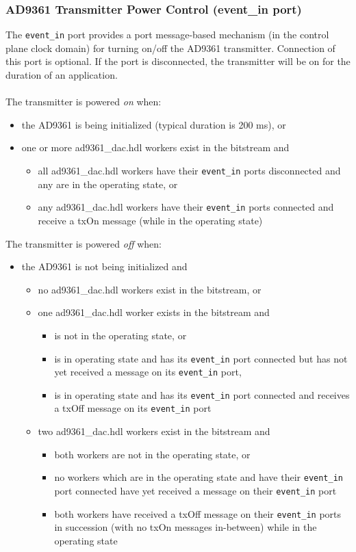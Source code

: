 \documentclass{article}
\def\comp{ad9361\_dac}
\begin{document}
\subsubsection*{AD9361 Transmitter Power Control (event\_in port)}
\noindent The \verb+event_in+ port provides a port message-based mechanism (in the control plane clock domain) for turning on/off the AD9361 transmitter. Connection of this port is optional. If the port is disconnected, the transmitter will be on for the duration of an application. \\ \\
\noindent The transmitter is powered \textit{on} when:
\begin{itemize}
  \item the AD9361 is being initialized (typical duration is 200 ms), or
  \item one or more \comp.hdl workers exist in the bitstream and
    \begin{itemize}
      \item all \comp.hdl workers have their \verb+event_in+ ports disconnected and any are in the operating state, or
      \item any \comp.hdl workers have their \verb+event_in+ ports connected and receive a txOn message (while in the operating state)
    \end{itemize}
\end{itemize}
The transmitter is powered \textit{off} when:
\begin{itemize}
  \item the AD9361 is not being initialized and
  \begin{itemize}
    \item no \comp.hdl workers exist in the bitstream, or
    \item one \comp.hdl worker exists in the bitstream and
      \begin{itemize}
        \item is not in the operating state, or
        \item is in operating state and has its \verb+event_in+ port connected but has not yet received a message on its \verb+event_in+ port,
        \item is in operating state and has its \verb+event_in+ port connected and receives a txOff message on its \verb+event_in+ port
      \end{itemize}
    \item two \comp.hdl workers exist in the bitstream and
      \begin{itemize}
        \item both workers are not in the operating state, or
        \item no workers which are in the operating state and have their \verb+event_in+ port connected have yet received a message on their \verb+event_in+ port
        \item both workers have received a txOff message on their \verb+event_in+ ports in succession (with no txOn messages in-between) while in the operating state
      \end{itemize}
  \end{itemize}
\end{itemize}
\end{document}
